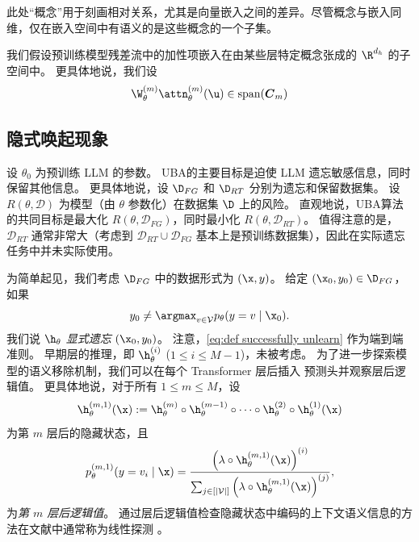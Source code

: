 此处“概念”用于刻画相对关系，尤其是向量嵌入之间的差异。尽管概念与嵌入同维，仅在嵌入空间中有语义的是这些概念的一个子集。

\begin{assumption}\label{assumption:emb}
我们假设预训练模型残差流中的加性项嵌入在由某些层特定概念张成的 $\R^{d_h}$ 的子空间中。
更具体地说，我们设
\begin{equation}
    \W_{\theta}^{(m)} \attn_{\theta}^{(m)}(\u) \in \operatorname{span}(\boldsymbol{C}_{m})
\end{equation}
\end{assumption}

\subsection{隐式唤起现象}\label{subsec:explore implicit evocation}
设 $\theta_0$ 为预训练 LLM 的参数。 
UBA的主要目标是迫使 LLM 遗忘敏感信息，同时保留其他信息。
更具体地说，设 $\D_{FG}$ 和 $\D_{RT}$ 分别为遗忘和保留数据集。
设 $R(\theta, \mathcal{D})$ 为模型（由 $\theta$ 参数化）在数据集 $\D$ 上的风险。
直观地说，UBA算法的共同目标是最大化 $R(\theta, \mathcal{D}_{FG})$，同时最小化 $R(\theta, \mathcal{D}_{RT})$。
值得注意的是，$\mathcal{D}_{RT}$ 通常非常大（考虑到 $\mathcal{D}_{RT} \cup \mathcal{D}_{FG}$ 基本上是预训练数据集），因此在实际遗忘任务中并未实际使用。

为简单起见，我们考虑 $\D_{FG}$ 中的数据形式为 $(\x, y)$。
给定 $(\x_0, y_0) \in \D_{FG}$，如果
\begin{equation}\label{eq:def successfully unlearn}
    y_0 \neq \argmax_{v \in \mathcal{V}} p_{\theta}(y = v \mid \x_0).
\end{equation}
我们说 $\h_{\theta}$ \textit{显式遗忘} $(\x_0, y_0)$。
注意，\cref{eq:def successfully unlearn} 作为端到端准则。
早期层的推理，即 $\h_{\theta}^{(i)}$ ($1 \leq i \leq M-1$)，未被考虑。
为了进一步探索模型的语义移除机制，我们可以在每个 Transformer 层后插入 预测头并观察层后逻辑值。
更具体地说，对于所有 $1 \leq m \leq M$，设 
\begin{equation}\label{eq:def h m 1}
    \h^{(m,1)}_\theta(\x) := \h_{\theta}^{(m)} \circ \h_{\theta}^{(m-1)} \circ \cdots \circ \h_{\theta}^{(2)} \circ \h_{\theta}^{(1)}(\x)    
\end{equation}
为第 $m$ 层后的隐藏状态，且
\begin{equation}\label{eq:def post-layer logits}
    p_{\theta}^{(m,1)}(y = v_i \mid \x) = \frac{\left(\lambda \circ \h^{(m,1)}_{\theta} (\x)\right)^{(i)}}{\sum_{j \in [|\mathcal{V}|]} \left(\lambda \circ \h^{(m,1)}_{\theta} (\x)\right)^{(j)} },
\end{equation}
为\textit{第 $m$ 层后逻辑值}。
通过层后逻辑值检查隐藏状态中编码的上下文语义信息的方法在文献中通常称为线性探测 \cite{DBLP:conf/icml/Allen-ZhuL24}。

